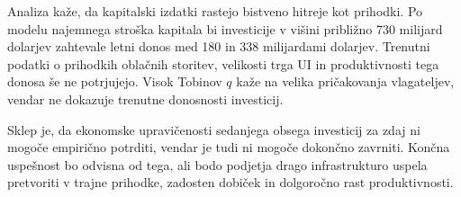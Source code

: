 \documentclass[12pt,a4paper]{article}
\begin{document}
Analiza kaže, da kapitalski izdatki rastejo bistveno hitreje kot prihodki. Po modelu najemnega stroška kapitala bi investicije v višini približno 730 milijard dolarjev zahtevale letni donos med 180 in 338 milijardami dolarjev. Trenutni podatki o prihodkih oblačnih storitev, velikosti trga UI in produktivnosti tega donosa še ne potrjujejo. Visok Tobinov $q$ kaže na velika pričakovanja vlagateljev, vendar ne dokazuje trenutne donosnosti investicij.

Sklep je, da ekonomske upravičenosti sedanjega obsega investicij za zdaj ni mogoče empirično potrditi, vendar je tudi ni mogoče dokončno zavrniti. Končna uspešnost bo odvisna od tega, ali bodo podjetja drago infrastrukturo uspela pretvoriti v trajne prihodke, zadosten dobiček in dolgoročno rast produktivnosti.

\FloatBarrier

\nocite{StanfordAIIndex2026,OECD2026,FederalReserve2026,
        Microsoft10K2022,Microsoft2026Q3,FREDDFII10,BLSPPI,
        Verdict2025,iTiger2025,CUBEResearch,Grobovsek2026,Polanec2014}



\end{document}
